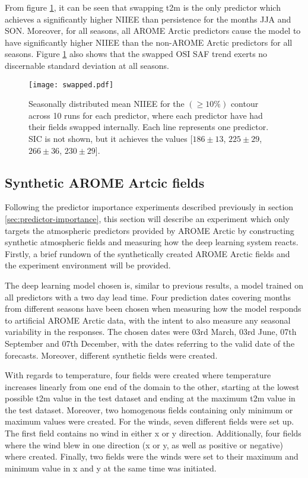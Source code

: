 \documentclass[../main/thesis.tex]{subfiles}
\begin{document}
From figure \ref{fig:swapped}, it can be seen that swapping t2m is the only predictor which achieves a significantly higher NIIEE than persistence for the months JJA and SON. Moreover, for all seasons, all AROME Arctic predictors cause the model to have significantly higher NIIEE than the non-AROME Arctic predictors for all seasons. Figure \ref{fig:swapped} also shows that the swapped OSI SAF trend exerts no discernable standard deviation at all seasons.


\begin{figure}
    \centering
    \texttt{[image: swapped.pdf]}
    \caption{\label{fig:swapped}Seasonally distributed mean NIIEE for the $(\geq10\%)$ contour across 10 runs for each predictor, where each predictor have had their fields swapped internally. Each line represents one predictor. SIC is not shown, but it achieves the values [$186 \pm 13$, $225 \pm 29$, $266 \pm 36$, $230 \pm 29$].}
\end{figure}

\subsection{Synthetic AROME Artcic fields}
\label{sec:synthetic_preds}
Following the predictor importance experiments described previously in section \ref{sec:predictor-importance}, this section will describe an experiment which only targets the atmospheric predictors provided by AROME Arctic by constructing synthetic atmospheric fields and measuring how the deep learning system reacts. Firstly, a brief rundown of the synthetically created AROME Arctic fields and the experiment environment will be provided.

The deep learning model chosen is, similar to previous results, a model trained on all predictors with a two day lead time. Four prediction dates covering months from different seasons have been chosen when measuring how the model responds to artificial AROME Arctic data, with the intent to also measure any seasonal variability in the responses. The chosen dates were 03rd March, 03rd June, 07th September and 07th December, with the dates referring to the valid date of the forecasts. Moreover, different synthetic fields were created. 

With regards to temperature, four fields were created where temperature increases linearly from one end of the domain to the other, starting at the lowest possible t2m value in the test dataset and ending at the maximum t2m value in the test dataset. Moreover, two homogenous fields containing only minimum or maximum values were created. For the winds, seven different fields were set up. The first field contains no wind in either x or y direction. Additionally, four fields where the wind blew in one direction (x or y, as well as positive or negative) where created. Finally, two fields were the winds were set to their maximum and minimum value in x and y at the same time was initiated.
\end{document}
